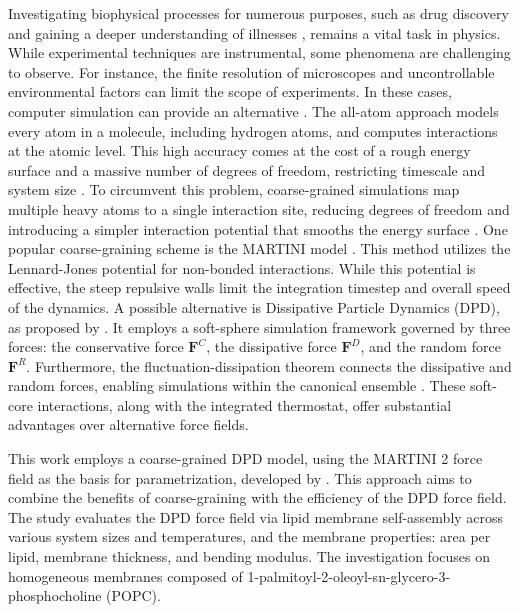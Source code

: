 \documentclass[
    11pt,
    a4paper,
    oneside,        %
    BCOR=10mm,      %
    parskip=half,   %
    listof=nototoc,   %
    bibliography=totoc %
]{scrreprt}
\begin{document}
Investigating biophysical processes for numerous purposes, such as drug discovery \cite{biophysics_drug_disc} and gaining a deeper understanding of illnesses \cite{biophysics_cancer}, remains a vital task in physics. While experimental techniques are instrumental, some phenomena are challenging to observe. For instance, the finite resolution of microscopes and uncontrollable environmental factors can limit the scope of experiments. In these cases, computer simulation can provide an alternative \cite{all_atom_drug_disc,all_atom_md}. The all-atom approach models every atom in a molecule, including hydrogen atoms, and computes interactions at the atomic level. This high accuracy comes at the cost of a rough energy surface and a massive number of degrees of freedom, restricting timescale and system size \cite{all_atom_md}. To circumvent this problem, coarse-grained simulations map multiple heavy atoms to a single interaction site, reducing degrees of freedom and introducing a simpler interaction potential that smooths the energy surface \cite{cg_review_speedups}. One popular coarse-graining scheme is the MARTINI model \cite{Martini}. This method utilizes the Lennard-Jones potential for non-bonded interactions. While this potential is effective, the steep repulsive walls limit the integration timestep and overall speed of the dynamics. A possible alternative is Dissipative Particle Dynamics (DPD), as proposed by \citeauthor{DPD_groot_warren} \cite{DPD_groot_warren}. It employs a soft-sphere simulation framework governed by three forces: the conservative force $\mathbf F^C$, the dissipative force $\mathbf F^D$, and the random force $\mathbf F^R$. Furthermore, the fluctuation-dissipation theorem connects the dissipative and random forces, enabling simulations within the canonical ensemble \cite{Espanol_warren}. These soft-core interactions, along with the integrated thermostat, offer substantial advantages over alternative force fields.

This work employs a coarse-grained DPD model, using the MARTINI 2 force field as the basis for parametrization, developed by \citeauthor{Wang2024} \cite{Wang2024}. This approach aims to combine the benefits of coarse-graining with the efficiency of the DPD force field. The study evaluates the DPD force field via lipid membrane self-assembly across various system sizes and temperatures, and the membrane properties: area per lipid, membrane thickness, and bending modulus. The investigation focuses on homogeneous membranes composed of 1-palmitoyl-2-oleoyl-sn-glycero-3-phosphocholine (POPC).
\end{document}
